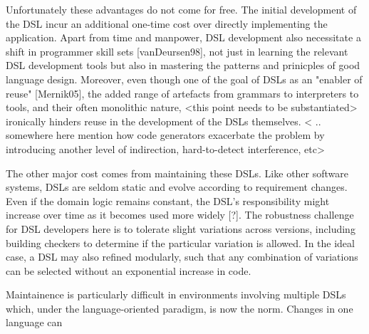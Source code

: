 Unfortunately these advantages do not come for free. The initial development of the DSL incur an additional one-time cost over directly implementing the application. Apart from time and manpower, DSL development also necessitate a shift in programmer skill sets [vanDeursen98], not just in learning the relevant DSL development tools but also in mastering the patterns and prinicples of good language design. Moreover, even though one of the goal of DSLs as an "enabler of reuse" [Mernik05], the added range of artefacts from grammars to interpreters to tools, and their often monolithic nature, <this point needs to be substantiated> ironically hinders reuse in the development of the DSLs themselves. < .. somewhere here mention how code generators exacerbate the problem by introducing another level of indirection, hard-to-detect interference, etc>

The other major cost comes from maintaining these DSLs. Like other software systems, DSLs are seldom static and evolve according to requirement changes. Even if the domain logic remains constant, the DSL's responsibility might increase over time as it becomes used more widely [?]. The robustness challenge for DSL developers here is to tolerate slight variations across versions, including building checkers to determine if the particular variation is allowed. In the ideal case, a DSL may also refined modularly, such that any combination of variations can be selected without an exponential increase in code.

Maintainence is particularly difficult in environments involving multiple DSLs which, under the language-oriented paradigm, is now the norm. Changes in one language can 



